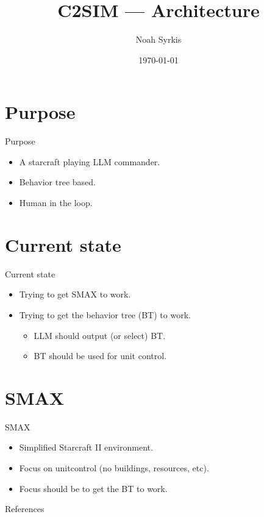 \documentclass[aspectratio=32]{beamer}
\title{C2SIM --- Architecture}
\date{\mydate\today}
\author{Noah Syrkis}
\providecommand{\tightlist}{\setlength{\itemsep}{0pt}\setlength{\parskip}{0pt}}
\begin{document}
  \begin{frame}[allowframebreaks]
    \titlepage
  \end{frame}

  \section{\textbar{} Purpose}\label{purpose}

  \begin{frame}[allowframebreaks]{\textbar{} Purpose}
  \begin{itemize}
  \tightlist
  \item
    A starcraft playing LLM commander.
  \item
    Behavior tree based.
  \item
    Human in the loop.
  \end{itemize}
  \end{frame}

  \section{\textbar{} Current state}\label{current-state}

  \begin{frame}[allowframebreaks]{\textbar{} Current state}
  \begin{itemize}
  \tightlist
  \item
    Trying to get SMAX \autocite{rutherford2023} to work.
  \item
    Trying to get the behavior tree (BT) to work.

    \begin{itemize}
    \tightlist
    \item
      LLM should output (or select) BT.
    \item
      BT should be used for unit control.
    \end{itemize}
  \end{itemize}
  \end{frame}

  \section{\textbar{} SMAX}\label{smax}

  \begin{frame}[allowframebreaks]{\textbar{} SMAX}
  \begin{itemize}
  \tightlist
  \item
    Simplified Starcraft II environment.
  \item
    Focus on unitcontrol (no buildings, resources, etc).
  \item
    Focus should be to get the BT to work.
  \end{itemize}
  \end{frame}

  
\begin{frame}[allowframebreaks]
  \Large{References}
  \small\linespread{1.2}\printbibliography
\end{frame}
\end{document}
